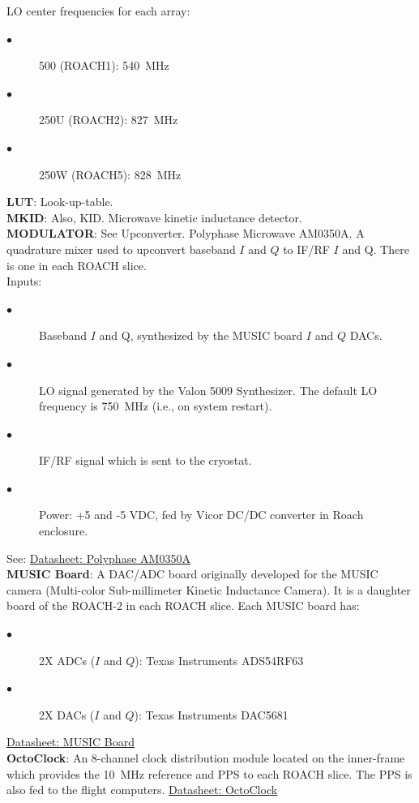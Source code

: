 LO center frequencies for each array:
\begin{description}
  \item[$\bullet$] 500 (ROACH1): 540~MHz
  \item[$\bullet$] 250U (ROACH2): 827~MHz
  \item[$\bullet$] 250W (ROACH5): 828~MHz
\end{description}
\textbf{LUT}: Look-up-table.\\
\textbf{MKID}: Also, KID\@. Microwave kinetic inductance detector.\\
\textbf{MODULATOR}: See Upconverter. Polyphase Microwave AM0350A. A quadrature mixer used to upconvert baseband $I$ and $Q$ to IF/RF $I$ and Q. There is one in each ROACH slice.\\
Inputs:
\begin{description}
  \item[$\bullet$] Baseband $I$ and Q, synthesized by the MUSIC board $I$ and $Q$ DACs.
  \item[$\bullet$] LO signal generated by the Valon 5009 Synthesizer. The default LO frequency is 750~MHz (i.e., on system restart).
  \item[$\bullet$ ]IF/RF signal which is sent to the cryostat.
  \item[$\bullet$] Power: +5 and -5 VDC, fed by Vicor DC/DC converter in Roach enclosure.
\end{description}
See: \href{https://polyphasemicrowave.com/media/AM0350A_RevA.pdf}{Datasheet: Polyphase AM0350A}\\
\textbf{MUSIC Board}: A DAC/ADC board originally developed for the MUSIC camera (Multi-color Sub-millimeter Kinetic Inductance Camera). It is a daughter board of the ROACH-2 in each ROACH slice. Each MUSIC board has:
\begin{description}
  \item[$\bullet$] 2X ADCs ($I$ and $Q$): Texas Instruments ADS54RF63
  \item[$\bullet$] 2X DACs ($I$ and $Q$): Texas Instruments DAC5681
\end{description}
\href{https://www.techneinstruments.com/boards-for-roach}{Datasheet: MUSIC Board}\\
\textbf{OctoClock}: An 8-channel clock distribution module located on the inner-frame which provides the 10~MHz reference and PPS to each ROACH slice. The PPS is also fed to the flight computers. \href{https://www.ettus.com/product/details/OctoClock}{Datasheet: OctoClock}\\
